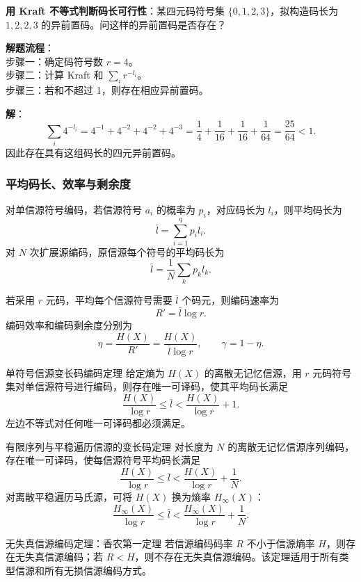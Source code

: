 \begin{example}
\label{ex:ch5-kraft-length-feasibility}
\textbf{用 Kraft 不等式判断码长可行性}：某四元码符号集 $\{0,1,2,3\}$，拟构造码长为 $1,2,2,3$ 的异前置码。问这样的异前置码是否存在？

\noindent \textbf{解题流程}：\\[2pt]
步骤一：确定码符号数 $r=4$。\\
步骤二：计算 Kraft 和 $\sum_i r^{-l_i}$。\\
步骤三：若和不超过 1，则存在相应异前置码。

\textbf{解}：
\[
\sum_i4^{-l_i}=4^{-1}+4^{-2}+4^{-2}+4^{-3}
=\frac14+\frac1{16}+\frac1{16}+\frac1{64}
=\frac{25}{64}<1.
\]
因此存在具有这组码长的四元异前置码。
\end{example}

\subsubsection{平均码长、效率与剩余度}

对单信源符号编码，若信源符号 $a_i$ 的概率为 $p_i$，对应码长为 $l_i$，则平均码长为
\[
\bar l=\sum_{i=1}^{q}p_i l_i.
\]
对 $N$ 次扩展源编码，原信源每个符号的平均码长为
\[
\bar l=\frac{1}{N}\sum_k p_k l_k.
\]

若采用 $r$ 元码，平均每个信源符号需要 $\bar l$ 个码元，则编码速率为
\[
R'=\bar l\log r.
\]
编码效率和编码剩余度分别为
\[
\eta=\frac{H(X)}{R'}=\frac{H(X)}{\bar l\log r},
\qquad
\gamma=1-\eta.
\]

\begin{theoremBox}{单符号信源变长码编码定理}
给定熵为 $H(X)$ 的离散无记忆信源，用 $r$ 元码符号集对单信源符号进行编码，则存在唯一可译码，使其平均码长满足
\[
\frac{H(X)}{\log r}\le \bar l < \frac{H(X)}{\log r}+1.
\]
左边不等式对任何唯一可译码都必须满足。
\end{theoremBox}

\begin{theoremBox}{有限序列与平稳遍历信源的变长码定理}
对长度为 $N$ 的离散无记忆信源序列编码，存在唯一可译码，使每信源符号平均码长满足
\[
\frac{H(X)}{\log r}\le \bar l < \frac{H(X)}{\log r}+\frac{1}{N}.
\]
对离散平稳遍历马氏源，可将 $H(X)$ 换为熵率 $H_\infty(X)$：
\[
\frac{H_\infty(X)}{\log r}\le \bar l < \frac{H_\infty(X)}{\log r}+\frac{1}{N}.
\]
\end{theoremBox}

\begin{theoremBox}{无失真信源编码定理：香农第一定理}
若信源编码码率 $R$ 不小于信源熵率 $H$，则存在无失真信源编码；若 $R<H$，则不存在无失真信源编码。该定理适用于所有类型信源和所有无损信源编码方式。
\end{theoremBox}

